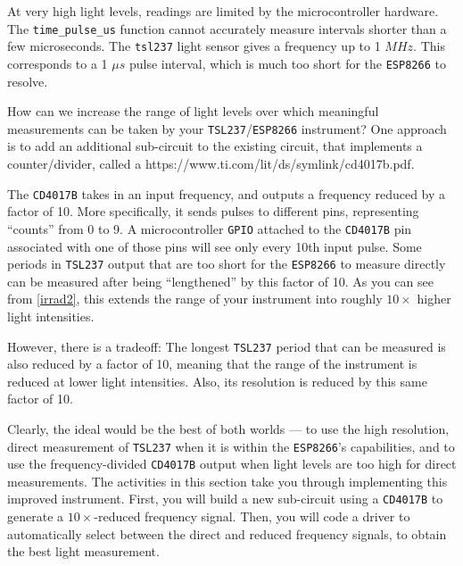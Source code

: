 {At very high light levels, readings are limited by the microcontroller hardware.
The \lstinline{time_pulse_us} function cannot accurately measure intervals shorter than a few microseconds.
The \texttt{tsl237} light sensor gives a frequency up to 1 $MHz$.
This corresponds to a 1 $\mu s$ pulse interval, which is much too short for the \texttt{ESP8266} to resolve.

How can we increase the range of light levels over which meaningful measurements can be taken by your \texttt{TSL237}/\texttt{ESP8266} instrument?
One approach is to add an additional sub-circuit to the existing circuit, that implements a counter/divider, called a  {https://www.ti.com/lit/ds/symlink/cd4017b.pdf}.

The \texttt{CD4017B} takes in an input frequency, and outputs a frequency reduced by a factor of 10.
More specifically, it sends pulses to different pins, representing ``counts'' from 0 to 9.
A microcontroller \texttt{GPIO} attached to the \texttt{CD4017B} pin associated with one of those pins will see only every 10th input pulse.
Some periods in \texttt{TSL237} output that are too short for the \texttt{ESP8266} to measure directly can be measured after being ``lengthened'' by  this factor of 10.
As you can see from \ref{irrad2}, this extends the range of your instrument into roughly $10\times$ higher light intensities.

However, there is a tradeoff:
The longest \texttt{TSL237} period that can be measured is also reduced by a factor of 10, meaning that the range of the instrument is reduced at lower light intensities.
Also, its resolution is reduced by this same factor of 10.

Clearly, the ideal would be the best of both worlds --- to use the high resolution, direct measurement of \texttt{TSL237} when it is within the \texttt{ESP8266}'s capabilities, and to use the frequency-divided \texttt{CD4017B} output when light levels are too high for direct measurements.
The activities in this section take you through implementing this improved instrument.
First, you will build a new sub-circuit using a \texttt{CD4017B} to generate a $10\times$-reduced frequency signal.
Then, you will code a driver to automatically select between the direct and reduced frequency signals, to obtain the best light measurement.


}
